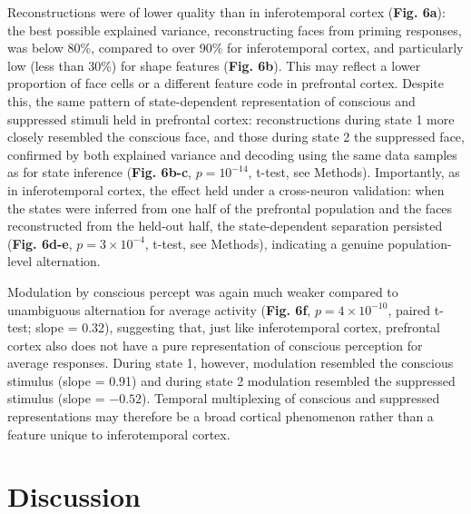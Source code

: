 \documentclass{article}
\begin{document}
Reconstructions were of lower quality than in inferotemporal cortex (\textbf{Fig. 6a}): the best possible explained variance, reconstructing faces from priming responses, was below 80\%, compared to over 90\% for inferotemporal cortex, and particularly low (less than 30\%) for shape features (\textbf{Fig. 6b}). This may reflect a lower proportion of face cells or a different feature code in prefrontal cortex. Despite this, the same pattern of state-dependent representation of conscious and suppressed stimuli held in prefrontal cortex: reconstructions during state 1 more closely resembled the conscious face, and those during state 2 the suppressed face, confirmed by both explained variance and decoding using the same data samples as for state inference (\textbf{Fig. 6b-c}, $p = 10^{-14}$, t-test, see Methods). Importantly, as in inferotemporal cortex, the effect held under a cross-neuron validation: when the states were inferred from one half of the prefrontal population and the faces reconstructed from the held-out half, the state-dependent separation persisted (\textbf{Fig. 6d-e}, $p = 3 \times 10^{-4}$, t-test, see Methods), indicating a genuine population-level alternation.

Modulation by conscious percept was again much weaker compared to unambiguous alternation for average activity (\textbf{Fig. 6f}, $p = 4 \times 10^{-10}$, paired t-test; slope = 0.32), suggesting that, just like inferotemporal cortex, prefrontal cortex also does not have a pure representation of conscious perception for average responses. During state 1, however, modulation resembled the conscious stimulus (slope = 0.91) and during state 2 modulation resembled the suppressed stimulus (slope = $-0.52$). Temporal multiplexing of conscious and suppressed representations may therefore be a broad cortical phenomenon rather than a feature unique to inferotemporal cortex.

\section*{Discussion}
\end{document}
